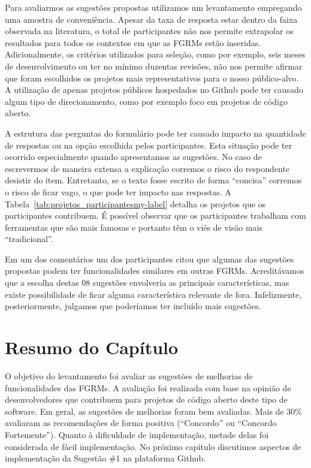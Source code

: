 Para avaliarmos as sugestões propostas utilizamos um levantamento empregando
uma amostra de conveniência. Apesar da taxa de resposta estar dentro da faixa
observada na literatura, o total de participantes não nos permite extrapolar os
resultados para todos os contextos em que as FGRMs estão inseridas.
Adicionalmente, os critérios utilizados para seleção, como por exemplo, seis
meses de desenvolvimento ou ter no mínimo duzentas revisões, não nos permite
afirmar que foram escolhidos os projetos mais representativos para o nosso
público-alvo. A utilização de apenas projetos públicos hospedados no Github
pode ter causado algum tipo de direcionamento, como por exemplo foco em
projetos de código aberto.

A estrutura das perguntas do formulário pode ter causado impacto na quantidade
de respostas ou na opção escolhida pelos participantes. Esta situação pode ter
ocorrido especialmente quando apresentamos as sugestões. No caso de escrevermos
de maneira extensa a explicação corremos o risco do respondente desistir do
item. Entretanto, se o texto fosse escrito de forma ``concisa'' corremos o risco
de ficar vago, o que pode ter impacto nas respostas. A
Tabela~\ref{tab:projetos_participantesmy-label} detalha os projetos que os
participantes contribuem. É possível observar que os participantes trabalham com
ferramentas que são mais famosas e portanto têm o viés de visão mais
``tradicional''.

Em um dos comentários um dos participantes citou que algumas das sugestões
propostas podem ter funcionalidades similares em outras FGRMs. Acreditávamos que
a escolha destas 08 sugestões envolveria as principais características, mas
existe possibilidade de ficar alguma característica relevante de fora.
Infelizmente, posteriormente, julgamos que poderíamos ter incluído mais
sugestões.

\section{Resumo do Capítulo}
\label{sec:sug_melhoria_resumo}

O objetivo do levantamento foi avaliar as sugestões de melhorias de
funcionalidades das FGRMs. A avaliação foi realizada com base na opinião de
desenvolvedores que contribuem para projetos de código aberto deste tipo de
software. Em geral, as sugestões de melhorias foram bem avaliadas. Mais de 30\%
avaliaram as recomendações de forma positiva (``Concordo'' ou  ``Concordo
Fortemente''). Quanto à dificuldade de implementação, metade delas foi
considerada de fácil implementação. No próximo capítulo discutimos aspectos de
implementação da Sugestão \#1 na plataforma Github.
